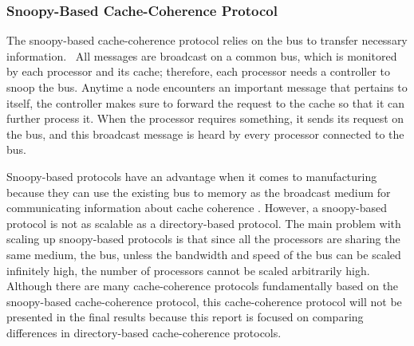 \documentclass[letterpaper]{article}
\begin{document}
\subsubsection[Snoopy{}-Based Cache{}-Coherence Protocol]{Snoopy{}-Based Cache-Coherence Protocol}
The snoopy-based cache-coherence protocol relies on the bus to transfer necessary information. \ All messages are broadcast on a common bus, which is monitored by each processor and its cache; therefore, each processor needs a controller to snoop the bus. Anytime a node encounters an important message that pertains to itself, the controller makes sure to forward the request to the cache so that it can further process it. When the processor requires something, it sends its request on the bus, and this broadcast message is heard by every processor connected to the bus.

Snoopy-based protocols have an advantage when it comes to manufacturing because they can use the existing bus to memory as the broadcast medium for communicating information about cache coherence \cite{HEN00}. However, a snoopy-based protocol is not as scalable as a directory-based protocol. The main problem with scaling up snoopy-based protocols is that since all the processors are sharing the same medium, the bus, unless the bandwidth and speed of the bus can be scaled infinitely high, the number of processors cannot be scaled arbitrarily high. Although there are many cache-coherence protocols fundamentally based on the snoopy-based cache-coherence protocol, this cache-coherence protocol will not be presented in the final results because this report is focused on comparing differences in directory-based cache-coherence protocols.
\end{document}
